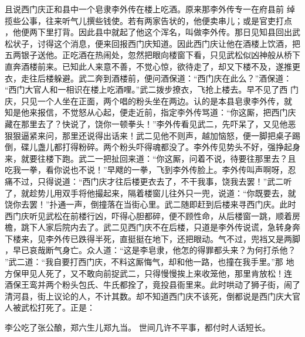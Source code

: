 且说西门庆正和县中一个皂隶李外传在楼上吃酒。原来那李外传专一在府县前
绰揽些公事，往来听气儿撰些钱使。若有两家告状的，他便卖串儿；或是官吏打点
，他便两下里打背。因此县中就起了他这个浑名，叫做李外传。那日见知县回出武
松状子，讨得这个消息，便来回报西门庆知道。因此西门庆让他在酒楼上饮酒，把
五两银子送他。正吃酒在热闹处，忽然把眼向楼窗下看，只见武松似凶神般从桥下
直奔酒楼前来。已知此人来意不善，不觉心惊，欲待走了，却又下楼不及，遂推更
衣，走往后楼躲避。武二奔到酒楼前，便问酒保道：“西门庆在此么？”酒保道：
“西门大官人和一相识在楼上吃酒哩。”武二拨步撩衣，飞抢上楼去。早不见了西
门庆，只见一个人坐在正面，两个唱的粉头坐在两边。认的是本县皂隶李外传，就
知是他来报信，不觉怒从心起，便走近前，指定李外传骂道：“你这厮，把西门庆
藏在那里去了？快说了，饶你一顿拳头！”李外传看见武二，先吓呆了，又见他恶
狠狠逼紧来问，那里还说得出话来！武二见他不则声，越加恼怒，便一脚把桌子踢
倒，碟儿盏儿都打得粉碎。两个粉头吓得魂都没了。李外传见势头不好，强挣起身
来，就要往楼下跑。武二一把扯回来道：“你这厮，问着不说，待要往那里去？且
吃我一拳，看你说也不说！”早飕的一拳，飞到李外传脸上。李外传叫声啊呀，忍
痛不过，只得说道：“西门庆才往后楼更衣去了，不干我事，饶我去罢！”武二听
了，就趁势儿用双手将他撮起来，隔着楼窗儿往外只一兜，说道：“你既要去，就
饶你去罢！”扑通一声，倒撞落在当街心里。武二随即赶到后楼来寻西门庆。此时
西门庆听见武松在前楼行凶，吓得心胆都碎，便不顾性命，从后楼窗一跳，顺着房
檐，跳下人家后院内去了。武二见西门庆不在后楼，只道是李外传说谎，急转身奔
下楼来，见李外传已跌得半死，直挺挺在地下，还把眼动。气不过，兜裆又是两脚
，早已哀哉断气身亡。众人道：“这是李皂隶，他怎的得罪都头来？为何打杀他？
”武二道：“我自要打西门庆，不料这厮悔气，却和他一路，也撞在我手里。”那
地方保甲见人死了，又不敢向前捉武二，只得慢慢挨上来收笼他，那里肯放松！连
酒保王鸾并两个粉头包氏、牛氏都拴了，竟投县衙里来。此时哄动了狮子街，闹了
清河县，街上议论的人，不计其数。却不知道西门庆不该死，倒都说是西门庆大官
人被武松打死了。正是：

李公吃了张公酿，郑六生儿郑九当。
世间几许不平事，都付时人话短长。